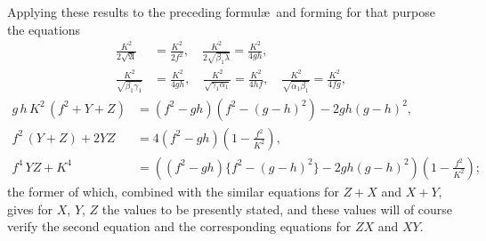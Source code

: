 \documentclass[11pt]{article}
\begin{document}
Applying these results to the preceding formul\ae\ and forming for that purpose the equations
\begin{align*}
\tfrac{K^2}{2\sqrt{\mathfrak{A}}} &= \tfrac{K^2}{2f^2}, \quad \tfrac{K^2}{2\sqrt{\beta_1\lambda}} = \tfrac{K^2}{4gh}, \\
\tfrac{K^2}{\sqrt{\beta_1\gamma_1}} &= \tfrac{K^2}{4gh}, \quad \tfrac{K^2}{\sqrt{\gamma_1\alpha_1}} = \tfrac{K^2}{4hf}, \quad \tfrac{K^2}{\sqrt{\alpha_1\beta_1}} = \tfrac{K^2}{4fg},
\end{align*}
\begin{align*}
g\,h\,K^2\,(f^2+Y+Z) &= (f^2-gh)(f^2-(g-h)^2)-2gh(g-h)^2,\\
f^2\,(Y+Z)+2YZ &= 4(f^2-gh)(1-\tfrac{f^2}{K^2}),\\
f^4\,YZ+K^4 &= ((f^2-gh)\{f^2-(g-h)^2\}-2gh(g-h)^2)(1-\tfrac{f^2}{K^2});
\end{align*}
the former of which, combined with the similar equations for $Z+X$ and $X+Y$, gives for $X$, $Y$, $Z$ the values to be presently stated, and these values will of course verify the second equation and the corresponding equations for $ZX$ and $XY$.

\newpage
\setcounter{page}{77}
\end{document}
